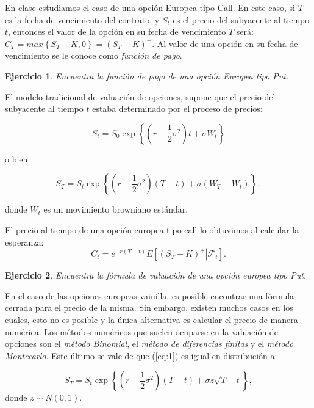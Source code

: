 \documentclass{article}
\newtheorem{ejercicio}{Ejercicio}
\begin{document}
En clase estudiamos el caso de una opción Europea tipo Call. En este caso, si $T$ es la fecha de vencimiento del contrato, y $S_t$ es el precio del subyacente al tiempo $t$,  entonces el valor de la opción en su fecha de vencimiento $T$ será: $C_T=max\left\{S_T-K, 0\right\} = \left(S_T-K\right)^+$. Al valor de una opción en su fecha de vencimiento se le conoce como \emph{función de pago}.

\begin{ejercicio}
    Encuentra la función de pago de una opción Europea tipo Put.
\end{ejercicio}

El modelo tradicional de valuación de opciones, supone que el precio del subyacente al tiempo $t$ estaba determinado por el proceso de precios:

\begin{equation*}
    S_t = S_0 \exp\left\{\left(r - \frac{1}{2}\sigma^2\right)t+\sigma W_t\right\}
\end{equation*}

o bien

\begin{equation}\label{eq:1}
    S_T = S_t \exp\left\{\left(r - \frac{1}{2}\sigma^2\right)(T-t)+\sigma \left(W_T-W_t\right)\right\},
\end{equation}

donde $W_t$ es un movimiento browniano estándar.

El precio al tiempo de una opción europea tipo call lo obtuvimos al calcular la esperanza: 
\begin{equation}\label{eq:2}
    C_t = e^{-r \left(T-t\right)}E\left[\left.\left(S_T-K\right)^+\right\vert \mathcal{F}_t\right].
\end{equation}

\begin{ejercicio}
    Encuentra la fórmula de valuación de una opción europea tipo Put.
\end{ejercicio}

En el caso de las opciones europeas vainilla, es posible encontrar una fórmula cerrada para el precio de la misma. Sin embargo, existen muchos casos en los cuales, esto no es posible y la única alternativa es calcular el precio de manera numérica. Los métodos numéricos que suelen ocuparse en la valuación de opciones son el \emph{método Binomial}, el \emph{método de diferencias finitas} y el \emph{método Montecarlo}. Este último se vale de que (\ref{eq:1}) es igual en distribución a:   

\begin{equation}\label{eq:3}
    S_T = S_t \exp\left\{\left(r - \frac{1}{2}\sigma^2\right)(T-t)+\sigma z \sqrt{T-t}\right\},
\end{equation}
donde $z\sim N(0,1)$.
\end{document}
